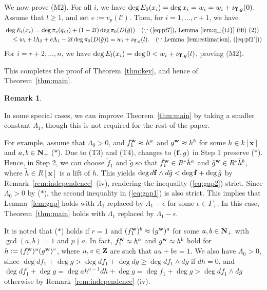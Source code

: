 \documentclass{amsart}
\theoremstyle{plain}
\theoremstyle{definition}
\newtheorem{rem}[thm]{Remark}
\newcommand{\Z}{{\bf Z}}
\newcommand{\N}{{\bf N}}
\newcommand{\ep}{\epsilon}
\newcommand{\x}{{\boldsymbol x}}
\newcommand{\w}{{\bf w}}
\newcommand{\ff}{{\bf f}}
\newcommand{\kx}{k[\x]}
\newcommand{\Rx}{R[\x]}
\newcommand{\degw  }{\deg}
\begin{document}
We now prove (M2). 
For all $i$, 
we have $\deg E_0(x_i)=\deg x_i=w_i=w_i+\nu _{\ff ,g}(0)$. 
Assume that $l\ge 1$, 
and set $e:=v_p(l!)$. 
Then, 
for $i=1,\ldots ,r+1$, we have 
\begin{align*}
&\degw E_l(x_i)=\degw \pi _e(q_{i,l})
+(1-2l)\degw \pi _0(D(\tilde{g})) \quad 
\text{($\because $ (\ref{eq:pf7}), Lemma~\ref{lem:q_{i,l}} (iii) (2))} \\
&\quad 
\le w_i+l\Lambda _2+e\Lambda _1-2l\deg \pi _0(D(\tilde{g}))=
w_i+\nu _{\ff ,g}(l). 
\quad 
\text{($\because $ Lemma~\ref{lem:estimation}, (\ref{eq:pf1'}))}
\end{align*}
For $i=r+2,\ldots ,n$, 
we have $\degw E_l(x_i)=\degw 0<w_i+\nu _{\ff ,g}(l)$, 
proving (M2). 



This completes the proof of Theorem~\ref{thm:key}, 
and hence of Theorem~\ref{thm:main}. 



\begin{rem}\label{rem:slight generalization}\rm 


In some special cases, 
we can improve Theorem~\ref{thm:main} 
by taking a smaller constant $\Lambda _1$, 
though this is not required for the rest of the paper. 


For example, assume that $\Lambda _0>0$, 
and $f_1^{\w }\approx h^a$ and $g^{\w }\approx h^b$ 
for some $h\in \kx $ and $a,b\in \N _+$ ($*$). 
Due to (T3) and (T4), 
changes to $(\ff ,g)$ in Step 1 preserve ($*$). 
Hence, in Step 2, 
we can choose $\tilde{f}_1$ and $\tilde{g}$ so that 
$\tilde{f}_1^{\w }\in R^*\tilde{h}^a$ and $\tilde{g}^{\w }\in R^*\tilde{h}^b$, 
where $\tilde{h}\in \Rx $ is a lift of $h$. 
This yields 
$\degw d\tilde{\ff }\wedge d\tilde{g}<\deg \tilde{\ff }+\deg \tilde{g}$ 
by Remark~\ref{rem:independence}~(iv), 
rendering the inequality (\ref{eq:gap2}) strict. 
Since $\Lambda _0>0$ by ($*$), 
the second inequality in (\ref{eq:gap1}) is also strict. 
This implies that Lemma~\ref{lem:gap} 
holds with $\Lambda _1$ replaced by 
$\Lambda _1-\ep $ for some $\ep \in \Gamma _+$. 
In this case, 
Theorem~\ref{thm:main} 
holds with $\Lambda _1$ replaced by 
$\Lambda _1-\ep $. 



It is noted that ($*$) holds 
if $r=1$ 
and $(f_1^{\w })^b\approx (g^{\w })^a$ for some 
$a,b\in \N _+$ with $\gcd (a,b)=1$ and $p\nmid a $. 
In fact, 
$f_1^{\w }\approx h^a$ and $g^{\w }\approx h^b$ hold for 
$h:=(f_1^{\w })^u(g^{\w })^v$, 
where $u,v\in \Z $ are such that $au+bv=1$. 
We also have $\Lambda _0>0$, 
since $\deg df_1+\deg g>\deg df_1+\deg dg\ge \deg df_1\wedge dg$ 
if $dh=0$, 
and 
$\deg df_1+\deg g=\deg ah^{a-1}dh+\deg g=\deg f_1+\deg g>\deg df_1\wedge dg$ 
otherwise by Remark~\ref{rem:independence} (iv). 
\end{rem}
\end{document}
